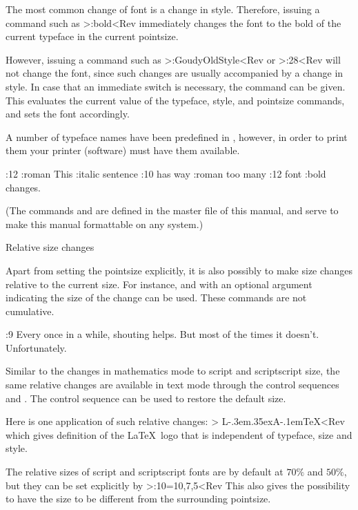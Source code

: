 The most common change of font is a change in style. Therefore,
issuing a command such as \Ver>\Style:bold<Rev immediately changes
the font to the bold of the current typeface in the current pointsize.

However, issuing a command such as \Ver>\Typeface:GoudyOldStyle<Rev
or \Ver>\PointSize:28<Rev will not change the font, since such
changes are usually accompanied by a change in style. In case that an
immediate switch is necessary, the command 
 can be given.
This evaluates the current value of the typeface, style, and
pointsize commands, and sets the font accordingly.

A number of typeface names have been predefined in \Lollipop,
however, in order to print them your printer (software) must have them
available.

\Example
\SerifFace \PointSize:12 
\Style:roman This \Style:italic sentence \PointSize:10 has
\SetFont way \SansFace \Style:roman too \SetFont many 
\PointSize:12 \SetFont font \Style:bold changes.
\ExampleStop 

(The commands  and  are defined in
the master file of this manual, and serve to make this manual
formattable on any system.)

\SubSection Relative size changes

Apart from setting the pointsize explicitly, it is also possibly to
make size changes relative to the current size. For instance,
 and  with an optional
argument indicating the size of the change can be used. These
commands are not cumulative.

\Example
\SerifFace
\PointSize:9 \SetFont Every once in a while,\SaveFont
\PointSizeLarger[2] shouting \PointSizeLarger helps.
\PointSizeSmaller[2]But most of the times it doesn't.
\RestoreFont Unfortunately.
\ExampleStop

Similar to the changes in mathematics mode to script and scriptscript
size, the same relative changes are available in text mode through
the control sequences  and . 
The control
sequence  can be used to restore the default size.

Here is one application of such relative changes:
\Ver>
L\kern -.3em\raise .35ex\hbox {\script A}\kern -.1em\TeX<Rev
which gives definition of the \LaTeX\ logo that is independent
of typeface, size and style.

The relative sizes of script and scriptscript fonts are by default at
$70\%$ and $50\%$, but they can be set explicitly by
\Ver>\PointSizeScriptSizes:10=10,7,5<Rev
This also gives the possibility to have the  size to be
different from the surrounding pointsize.

